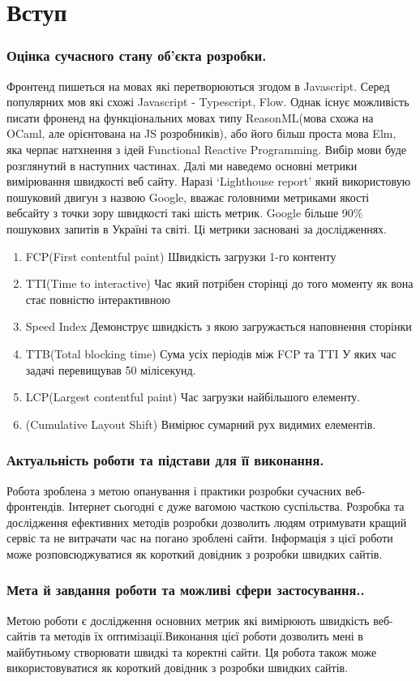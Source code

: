 \newpage
\section*{Вступ}
\label{sec:intro}
\subsubsection*{Оцінка сучасного стану об’єкта розробки.}
Фронтенд пишеться на мовах які перетворюються згодом в Javascript.
Серед популярних мов які схожі Javascript - Typescript, Flow.
Однак існує можливість писати фроненд на функціональних мовах типу
ReasonML(мова схожа на OCaml, але орієнтована на JS розробників),
або його більш проста мова Elm, яка черпає натхнення з ідей Functional Reactive Programming.
Вибір мови буде розглянутий в наступних частинах.
Далі ми наведемо основні метрики вимірювання швидкості веб сайту.
Наразі `Lighthouse report' який використовую пошуковий двигун з назвою Google, вважає головними метриками якості вебсайту з точки зору швидкості такі шість метрик.
Google більше 90\% пошукових запитів в Україні та світі.
Ці метрики засновані за дослідженнях.
\begin{enumerate}
    \item FCP(First contentful paint) Швидкість загрузки 1-го контенту
    \item TTI(Time to interactive) Час який потрібен сторінці до того моменту як вона стає повністю інтерактивною
    \item Speed Index Демонструє швидкість з якою загружається наповнення сторінки
    \item TTB(Total blocking time) Сума усіх періодів між FCP та TTI У яких час задачі перевищував 50 мілісекунд.
    \item LCP(Largest contentful paint) Час загрузки найбільшого елементу.
    \item (Cumulative Layout Shift) Вимірює сумарний рух видимих елементів.
\end{enumerate}

\subsubsection*{Актуальність роботи та підстави для її виконання.}
Робота зроблена з метою опанування і практики розробки сучасних веб-фронтендів.
Інтернет сьогодні є дуже вагомою часткою суспільства.
Розробка та дослідження ефективних методів розробки
дозволить людям отримувати кращий сервіс та не витрачати
час на погано зроблені сайти.
Інформація з цієї роботи може розповсюджуватися як короткий довідник з розробки швидких сайтів.
\subsubsection*{Мета й завдання роботи та можливі сфери застосування..}
Метою роботи є дослідження основних метрик які вимірюють швидкість веб-сайтів та методів їх оптимізації.Виконання цієї
роботи дозволить мені в майбутньому створювати швидкі та коректні сайти.
Ця робота також може використовуватися як короткий довідник з розробки швидких сайтів.
